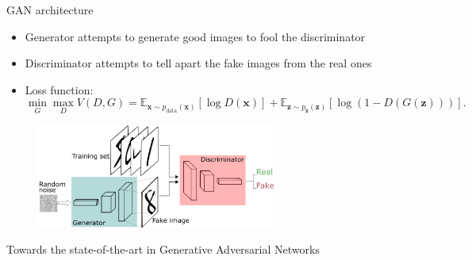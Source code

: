 \documentclass[8pt,xcolor=table,aspectratio=169]{beamer}
\begin{document}
\begin{frame}{GAN architecture}

\begin{itemize}
  \item Generator attempts to generate good images to fool the discriminator
  \item Discriminator attempts to tell apart the fake images from the real ones
  \item Loss function:
$$\min_G \max_D V(D, G) = \mathbb{E}_{\bm{x} \sim p_{\text{data}}(\bm{x})}[\log D(\bm{x})] + \mathbb{E}_{\bm{z} \sim p_{\bm{z}}(\bm{z})}[\log (1 - D(G(\bm{z})))].
$$
\end{itemize}

\begin{figure}
\centering
\includegraphics[width=0.7\textwidth]{gan}\\
\vspace{2em}


\end{figure}
\end{frame}

\begin{frame}[plain, c]

\begin{center}
\Huge Towards the state-of-the-art in Generative Adversarial Networks
\end{center}

\end{frame}
\end{document}
